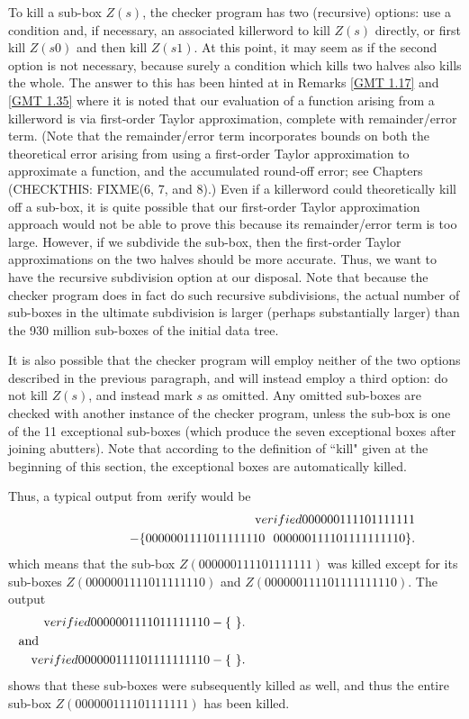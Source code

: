 \begin{construction}
To kill a sub-box $Z(s)$, the checker program has two (recursive) options:
use a condition and, if necessary, an associated killerword  to kill $Z(s)$ directly, or first kill $Z(s0)$ and then kill $Z(s1)$.
At this point, it may seem as if the second option is not necessary,
because surely a condition which kills two halves also kills the whole.
The answer to this has been hinted at in 
Remarks \ref{GMT 1.17} and \ref{GMT 1.35}
 where
it is noted that our evaluation of a function arising
from a killerword  is via first-order Taylor
approximation, complete with remainder/error term.
(Note that the remainder/error term incorporates bounds on
both the theoretical error arising from using a first-order Taylor
approximation to approximate a function, and the accumulated
round-off error; see 
	Chapters (CHECKTHIS: FIXME(6, 7,  and 8).)  %
Even if a killerword could theoretically kill off a sub-box,
it is quite possible that our
first-order Taylor approximation approach would not be
able to prove this 
because its remainder/error term is too large.
However, if we subdivide the sub-box, then the first-order
Taylor approximations on the two halves should be more accurate.  
Thus,
we want to have the recursive subdivision option at our
disposal.
Note that because the checker program does in fact do such 
recursive subdivisions, the actual number of sub-boxes in the
ultimate subdivision is larger (perhaps substantially larger)
than the 930 million sub-boxes of the initial data tree.

It is also possible that the checker program will employ
neither of the two options described in the previous
paragraph, and will instead employ  
a third option: do not kill $Z(s)$, and instead
mark $s$ as omitted.
Any omitted sub-boxes are checked with another instance
of the checker program,
unless the sub-box is one of the 11 exceptional
sub-boxes (which produce the seven exceptional boxes after joining abutters).
Note that according to the definition of ``kill" given at the beginning of this section, the exceptional boxes are
automatically killed.   

Thus, a typical output from {\textit verify} would be 
\begin{eqnarray*}
&&{\textrm verified} 000000111101111111 \\
&&\qquad\qquad\quad- 
\{ 0000001111011111110 \ \ 000000111101111111110 \} .
\end{eqnarray*}
which means that the sub-box $Z(000000111101111111)$ was killed except for its sub-boxes
$Z(0000001111011111110)$  and $Z(000000111101111111110).$  The output 
\begin{eqnarray*}
&&{\textrm verified} 0000001111011111110 - \{\ \}.\\
\noalign{\noindent and}
&&{\textrm verified} 000000111101111111110 - \{\ \}.
\end{eqnarray*} shows that these sub-boxes were subsequently killed as well, and thus the entire sub-box
$Z(000000111101111111)$ has been killed. 



\end{construction}
